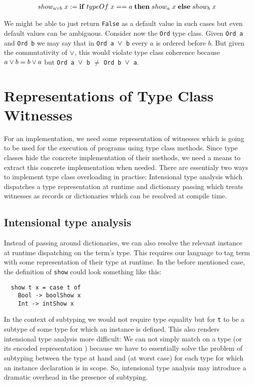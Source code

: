 \begin{gather}
  \nonumber show_{a\vee b} \; x := {\bf if} \; typeOf \; x == a \; {\bf then} \; show_a \; x \; {\bf else} \; show_b \; x
\end{gather}

We might be able to just return \texttt{False} as a default value in such cases but even default values can be ambiguous.
Consider now the \texttt{Ord} type class. Given \texttt{Ord a} and \texttt{Ord b} we may say that in \texttt{Ord a $\vee$ b} every $a$ is ordered before $b$.
But given the commutativity of $\vee$, this would violate type class coherence because $a \vee b = b \vee a$ but \texttt{Ord a $\vee$ b} $\neq$ \texttt{Ord b $\vee$ a}.


\section{Representations of Type Class Witnesses}
\label{sec:representations}

For an implementation, we need some representation of witnesses which is going to be used for the execution of programs using type class methods.
Since type classes hide the concrete implementation of their methods, we need a means to extract this concrete implementation when needed.
There are essentialy two ways to implement type class overloading in practise: Intensional type analysis which dispatches a type representation at runtime and dictionary passing which treats witnesses as records or dictionaries which can be resolved at compile time.

\subsection{Intensional type analysis}
\label{sec:intensional-analysis}

Instead of passing around dictionaries, we can also resolve the relevant instance at runtime dispatching on the term's type.
This requires our language to tag term with some representation of their type at runtime.
In the before mentioned case, the definition of \texttt{show} could look something like this:

\begin{verbatim}
  show t x = case t of
    Bool -> boolShow x
    Int -> intShow x
\end{verbatim}

In the context of subtyping we would not require type equality but for \texttt{t} to be a subtype of some type for which an instance is defined.
This also renders intensional type analysis more difficult:
We can not simply match on a type (or its encoded representation \cite{weirich2000}) because we have to essentially solve the problem of subtyping between the type at hand and (at worst case) for each type for which an instance declaration is in scope.
So, intensional type analysis may introduce a dramatic overhead in the presence of subtyping.

